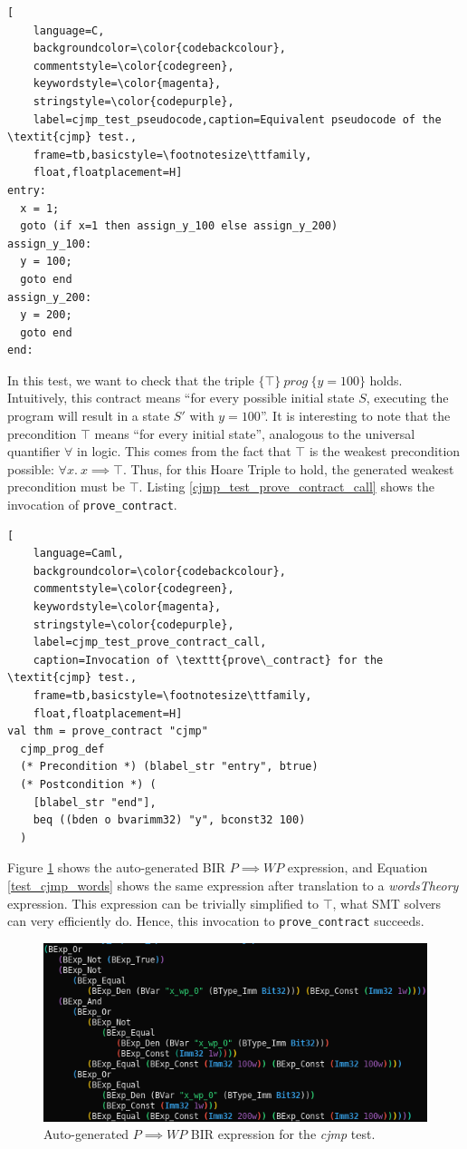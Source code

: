 \documentclass{kththesis}
\newcommand{\htriple}[3]{\ensuremath{\{#1\}~#2~\{#3\}}}
\newcommand{\WP}{\ensuremath{\mathit{WP}}}
\begin{document}
{\begin{lstlisting}[
    language=C,
    backgroundcolor=\color{codebackcolour},
    commentstyle=\color{codegreen},
    keywordstyle=\color{magenta},
    stringstyle=\color{codepurple},
    label=cjmp_test_pseudocode,caption=Equivalent pseudocode of the \textit{cjmp} test.,
    frame=tb,basicstyle=\footnotesize\ttfamily,
    float,floatplacement=H]
entry:
  x = 1;
  goto (if x=1 then assign_y_100 else assign_y_200)
assign_y_100:
  y = 100;
  goto end
assign_y_200:
  y = 200;
  goto end
end:
\end{lstlisting}

In this test, we want to check that the triple \htriple{\top}{prog}{y = 100} holds. Intuitively, this contract means ``for every possible initial state $S$, executing the program will result in a state $S'$ with $y=100$''. It is interesting to note that the precondition $\top$ means ``for every initial state'', analogous to the universal quantifier $\forall$ in logic. This comes from the fact that $\top$ is the weakest precondition possible: $\forall x.~x \implies \top$. Thus, for this Hoare Triple to hold, the generated weakest precondition must be $\top$. Listing \ref{cjmp_test_prove_contract_call} shows the invocation of \texttt{prove\_contract}.

\begin{lstlisting}[
    language=Caml,
    backgroundcolor=\color{codebackcolour},
    commentstyle=\color{codegreen},
    keywordstyle=\color{magenta},
    stringstyle=\color{codepurple},
    label=cjmp_test_prove_contract_call,
    caption=Invocation of \texttt{prove\_contract} for the \textit{cjmp} test.,
    frame=tb,basicstyle=\footnotesize\ttfamily,
    float,floatplacement=H]
val thm = prove_contract "cjmp"
  cjmp_prog_def
  (* Precondition *) (blabel_str "entry", btrue)
  (* Postcondition *) (
    [blabel_str "end"],
    beq ((bden o bvarimm32) "y", bconst32 100)
  )
\end{lstlisting}

Figure \ref{test_cjmp_bir} shows the auto-generated BIR $P \implies \WP$ expression, and Equation \ref{test_cjmp_words} shows the same expression after translation to a \textit{wordsTheory} expression. This expression can be trivially simplified to $\top$, what SMT solvers can very efficiently do. Hence, this invocation to \texttt{prove\_contract} succeeds.

\begin{figure}[!h]
	\includegraphics[width=\textwidth]{figures/test_cjmp_bir.png}
	\centering
	\caption{Auto-generated $P \implies \WP$ BIR expression for the \textit{cjmp} test.}
	\label{test_cjmp_bir}
\end{figure}

}
\end{document}
